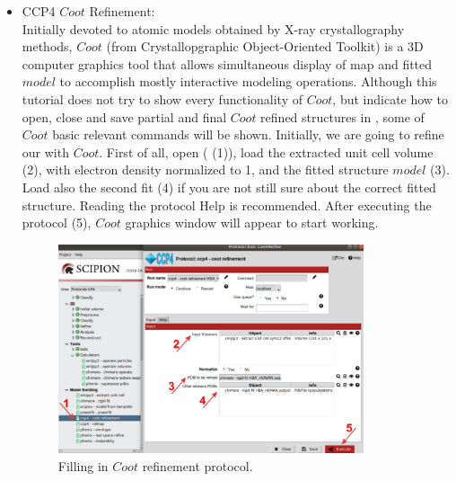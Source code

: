 \begin{itemize}
 \item CCP4 $Coot$ Refinement:\\
 
 Initially devoted to atomic models obtained by X-ray crystallography methods, $Coot$ (from Crystallopgraphic Object-Oriented Toolkit) is a 3D computer graphics tool that allows simultaneous display of map and fitted $model$ to accomplish mostly interactive modeling operations. Although this tutorial does not try to show every functionality of $Coot$, but indicate how to open, close and save partial and final $Coot$ refined structures in \scipion, some of $Coot$ basic relevant commands will be shown. Initially, we are going to refine our  with $Coot$. First of all, open  ( (1)), load the extracted unit cell volume (2), with electron density normalized to 1, and the fitted structure $model$ (3). Load also the second fit (4) if you are not still sure about the correct fitted structure. Reading the protocol Help is recommended. After executing the protocol (5), $Coot$ graphics window will appear to start working. 
 
 \begin{figure}[H]
  \centering 
  \captionsetup{width=.7\linewidth} 
  \includegraphics[width=0.85\textwidth]{Images/Fig24}
  \caption{Filling in $Coot$ refinement protocol.}
  \label{fig:coot_refinement_protocol}
  \end{figure}
  

\end{itemize}

